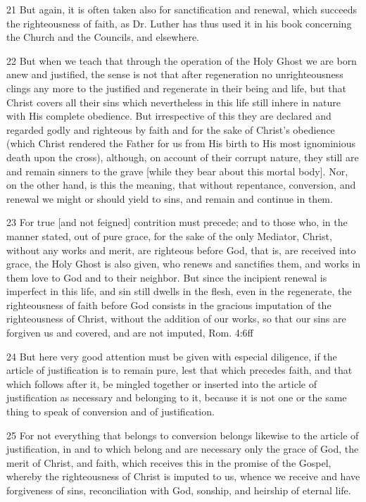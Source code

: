 21 But again, it is often taken also for sanctification and renewal, which succeeds the righteousness of faith, as Dr. Luther has thus used it in his book concerning the Church and the Councils, and elsewhere.

22 But when we teach that through the operation of the Holy Ghost we are born anew and justified, the sense is not that after regeneration no unrighteousness clings any more to the justified and regenerate in their being and life, but that Christ covers all their sins which nevertheless in this life still inhere in nature with His complete obedience. But irrespective of this they are declared and regarded godly and righteous by faith and for the sake of Christ’s obedience (which Christ rendered the Father for us from His birth to His most ignominious death upon the cross), although, on account of their corrupt nature, they still are and remain sinners to the grave [while they bear about this mortal body]. Nor, on the other hand, is this the meaning, that without repentance, conversion, and renewal we might or should yield to sins, and remain and continue in them.

23 For true [and not feigned] contrition must precede; and to those who, in the manner stated, out of pure grace, for the sake of the only Mediator, Christ, without any works and merit, are righteous before God, that is, are received into grace, the Holy Ghost is also given, who renews and sanctifies them, and works in them love to God and to their neighbor. But since the incipient renewal is imperfect in this life, and sin still dwells in the flesh, even in the regenerate, the righteousness of faith before God consists in the gracious imputation of the righteousness of Christ, without the addition of our works, so that our sins are forgiven us and covered, and are not imputed, Rom. 4:6ff

24 But here very good attention must be given with especial diligence, if the article of justification is to remain pure, lest that which precedes faith, and that which follows after it, be mingled together or inserted into the article of justification as necessary and belonging to it, because it is not one or the same thing to speak of conversion and of justification.

25 For not everything that belongs to conversion belongs likewise to the article of justification, in and to which belong and are necessary only the grace of God, the merit of Christ, and faith, which receives this in the promise of the Gospel, whereby the righteousness of Christ is imputed to us, whence we receive and have forgiveness of sins, reconciliation with God, sonship, and heirship of eternal life.

